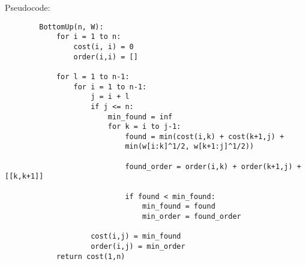\documentclass[12pt]{article}
\begin{document}
\begin{enumerate}
    Pseudocode:
    \begin{verbatim}
        BottomUp(n, W):
            for i = 1 to n:
                cost(i, i) = 0
                order(i,i) = []
            
            for l = 1 to n-1:
                for i = 1 to n-1:
                    j = i + l
                    if j <= n:
                        min_found = inf
                        for k = i to j-1:
                            found = min(cost(i,k) + cost(k+1,j) + 
                            min(w[i:k]^1/2, w[k+1:j]^1/2))

                            found_order = order(i,k) + order(k+1,j) + [[k,k+1]]

                            if found < min_found:
                                min_found = found
                                min_order = found_order

                    cost(i,j) = min_found
                    order(i,j) = min_order
            return cost(1,n)
    \end{verbatim}

 \end{enumerate}
\end{document}
